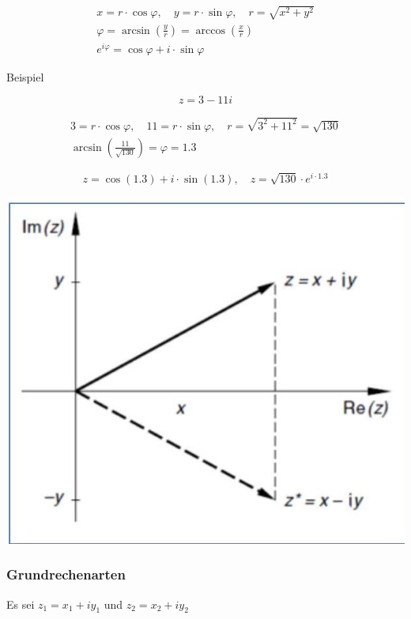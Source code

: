 $$
\begin{gathered}
x=r \cdot \cos \varphi, \quad y=r \cdot \sin \varphi, \quad r=\sqrt{x^{2}+y^{2}} \\
\varphi=\arcsin \left(\frac{y}{r}\right)=\arccos \left(\frac{x}{r}\right) \\
e^{i \varphi}=\cos \varphi+i \cdot \sin \varphi
\end{gathered}
$$

Beispiel

$$
z=3-11 i
$$

$$
\begin{gathered}
3=r \cdot \cos \varphi, \quad 11=r \cdot \sin \varphi, \quad r=\sqrt{3^{2}+11^{2}}=\sqrt{130} \\
\arcsin \left(\frac{11}{\sqrt{130}}\right)=\varphi=1.3
\end{gathered}
$$

$$
z=\cos (1.3)+i \cdot \sin (1.3), \quad z=\sqrt{130} \cdot e^{i \cdot 1.3}
$$

\begin{center}
\includegraphics[width=\linewidth]{images/2024_12_29_68ccba06d0091c162fa4g-11}
\end{center}

\subsubsection*{Grundrechenarten}
Es sei $z_{1}=x_{1}+i y_{1}$ und $z_{2}=x_{2}+i y_{2}$

